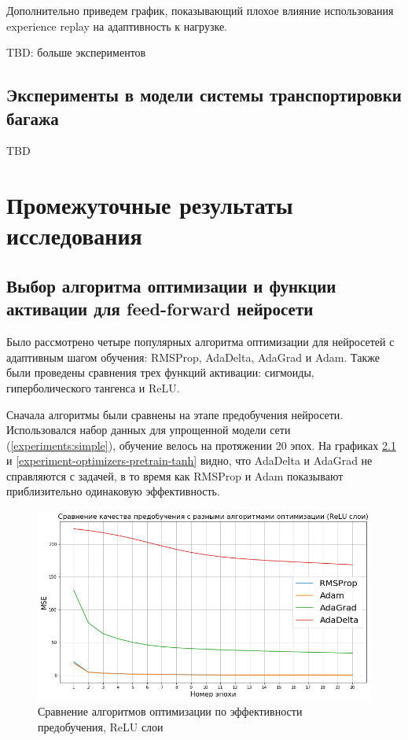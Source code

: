 \documentclass[specification, annotation]{itmo-student-thesis}
\begin{document}
Дополнительно приведем график, показывающий плохое влияние использования
experience replay на адаптивность к нагрузке.

TBD: больше экспериментов

\section{Эксперименты в модели системы транспортировки багажа}

\startconclusionpage

TBD

\printmainbibliography

\appendix

\chapter{Промежуточные результаты исследования}

\section{Выбор алгоритма оптимизации и функции активации для feed-forward нейросети}

Было рассмотрено четыре популярных алгоритма оптимизации для нейросетей с адаптивным
шагом обучения: RMSProp\cite{tieleman2012lecture},
AdaDelta\cite{zeiler2012adadelta}, AdaGrad\cite{duchi2011adaptive} и
Adam\cite{kingma2014adam}. Также были проведены сравнения трех функций
активации: сигмоиды, гиперболического тангенса и ReLU.

Сначала алгоритмы были сравнены на этапе предобучения нейросети. Использовался
набор данных для упрощенной модели сети (\ref{experiments:simple}), обучение
велось на протяжении 20 эпох. На графиках
\ref{experiment-optimizers-pretrain-relu} и
\ref{experiment-optimizers-pretrain-tanh} видно, что AdaDelta и AdaGrad не
справляются с задачей, в то время как RMSProp и Adam показывают приблизительно
одинаковую эффективность.

\begin{figure}[!h]
  \caption{Сравнение алгоритмов оптимизации по эффективности
    предобучения, ReLU слои}\label{experiment-optimizers-pretrain-relu}
  \centering
  \includegraphics[scale=0.6]{experiment-optimizers-pretrain-relu}
\end{figure}
\end{document}
